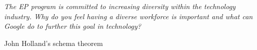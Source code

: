 
\emph{The EP program is committed to increasing diversity within the technology industry. Why do you feel having a diverse workforce is important and what can Google do to further this goal in technology?}


John Holland's schema theorem
